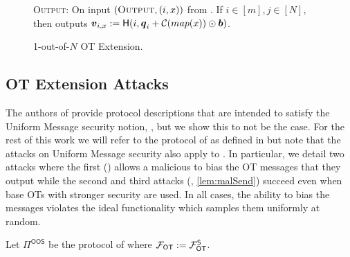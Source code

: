 \begin{figure}[t!]
{\begin{minipage}{0.95\linewidth}
			
			\textsc{Output:} On input $(\textsc{Output}, (i,x))$ from \send. If $i\in[m],j\in[N]$, then \send outputs $\boldsymbol{v}_{i,x}:=\mathsf{H}(i,\boldsymbol{q}_i+\mathcal{C}(map(x))\odot \boldsymbol{b})$.
	\end{minipage}}
	\caption{ 1-out-of-$N$ OT Extension.}
	\label{fig:otExt}
\end{figure}


%			


\subsection{OT Extension Attacks}\label{sec:extAttack}

The authors of \cite{C:KelOrsSch15,RSA:OrrOrsSch17} provide protocol descriptions that are intended to satisfy the Uniform Message security notion, , but we show this to not be the case. For the rest of this work we will refer to the protocol of \cite{RSA:OrrOrsSch17} as defined in  but note that the attacks on Uniform Message security also apply to \cite[Figure 6, 7]{C:KelOrsSch15}. In particular, we detail two attacks where the first ()  allows a malicious \rec to bias the OT messages that they output while the second and third attacks (, \ref{lem:malSend}) succeed even when base OTs with stronger security are used. In all cases, the ability to bias the messages violates the ideal functionality which samples them uniformly at random.


\begin{definition}\label{def:OOS}
	Let $\Pi^{\textsf{OOS}}$ be the protocol of  where $\mathcal{F}_{\mathsf{OT}}:=\mathcal{F}_{\mathsf{OT}}^\mathsf{S}$.
\end{definition}

